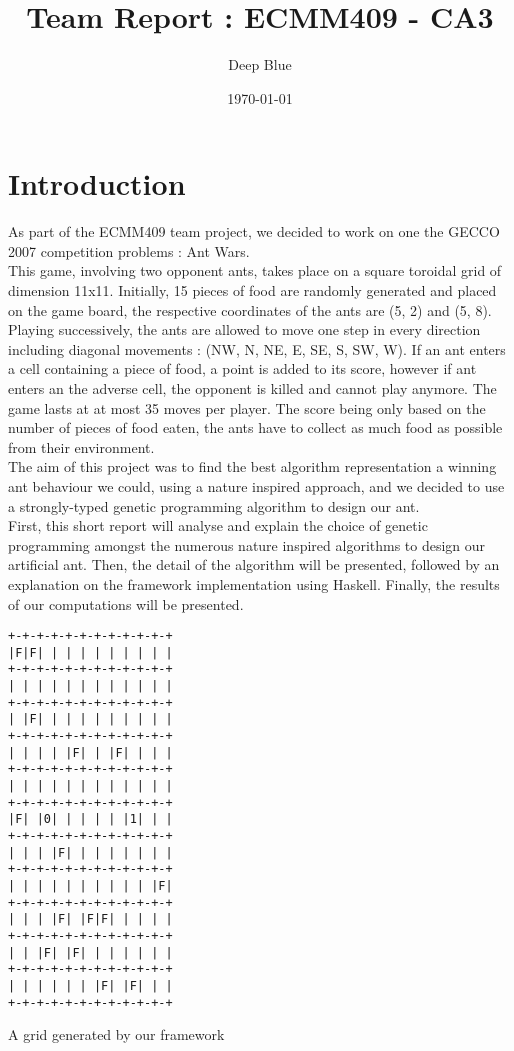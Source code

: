 \documentclass[10pt,a4paper]{article}
\begin{document}
\title{Team Report : ECMM409 - CA3}
\author {Deep Blue}
\date{\today}

\maketitle

\tableofcontents
\newpage

\section*{Introduction}

As part of the ECMM409 team project, we decided to work on one the
GECCO 2007 competition problems : Ant Wars.\\

This game, involving two opponent ants, takes place on a square
toroidal grid of dimension 11x11. Initially, 15 pieces of food are
randomly generated and placed on the game board, the respective
coordinates of the ants are (5, 2) and (5, 8). Playing successively,
the ants are allowed to move one step in every direction including
diagonal movements : (NW, N, NE, E, SE, S, SW, W). If an ant enters a
cell containing a piece of food, a point is added to its score,
however if ant enters an the adverse cell, the opponent is killed and
cannot play anymore. The game lasts at at most 35 moves per
player. The score being only based on the number of pieces of food
eaten, the ants have to collect as much food as possible from their
environment.\\

The aim of this project was to find the best algorithm representation
a winning ant behaviour we could, using a nature inspired approach,
and we decided to use a strongly-typed genetic programming algorithm
to design our ant.\\

First, this short report will analyse and explain the choice of
genetic programming amongst the numerous nature inspired algorithms to
design our artificial ant. Then, the detail of the algorithm will be
presented, followed by an explanation on the framework implementation
using Haskell. Finally, the results of our computations will be
presented.


\begin{center} 
\begin{verbatim}
+-+-+-+-+-+-+-+-+-+-+-+
|F|F| | | | | | | | | |
+-+-+-+-+-+-+-+-+-+-+-+
| | | | | | | | | | | |
+-+-+-+-+-+-+-+-+-+-+-+
| |F| | | | | | | | | |
+-+-+-+-+-+-+-+-+-+-+-+
| | | | |F| | |F| | | |
+-+-+-+-+-+-+-+-+-+-+-+
| | | | | | | | | | | |
+-+-+-+-+-+-+-+-+-+-+-+
|F| |0| | | | | |1| | |
+-+-+-+-+-+-+-+-+-+-+-+
| | | |F| | | | | | | |
+-+-+-+-+-+-+-+-+-+-+-+
| | | | | | | | | | |F|
+-+-+-+-+-+-+-+-+-+-+-+
| | | |F| |F|F| | | | |
+-+-+-+-+-+-+-+-+-+-+-+
| | |F| |F| | | | | | |
+-+-+-+-+-+-+-+-+-+-+-+
| | | | | | |F| |F| | |
+-+-+-+-+-+-+-+-+-+-+-+
\end{verbatim}
\end{center}
A grid generated by our framework
\end{document}
